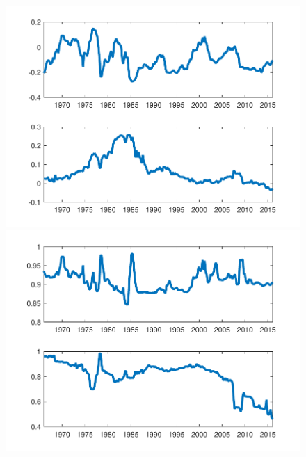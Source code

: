 \documentclass[12pt,reqno]{article}
\numberwithin{equation}{section}
\begin{document}
\begin{figure}[H]
\includegraphics[scale=0.6]{NKPC_optim_init_AR1_alphas.pdf}
\includegraphics[scale=0.6]{NKPC_optim_init_AR1_betas.pdf}


\end{figure}

\newpage
\end{document}
